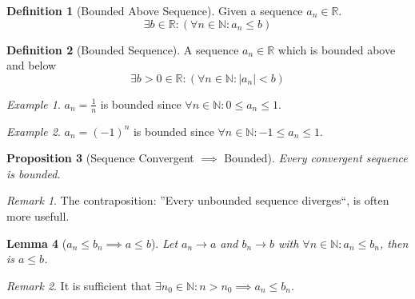 \documentclass[english,titlepage]{uzhpub}
\theoremstyle{definition}
\newtheorem{definition}{Definition}[section]
\theoremstyle{plain}
\newtheorem{proposition}[definition]{Proposition}
\newtheorem{lemma}[definition]{Lemma}
\theoremstyle{remark}
\newtheorem*{remark}{Remark}
\theoremstyle{example}
\newtheorem*{example}{Example}
\begin{document}
   \begin{definition}[Bounded Above Sequence]
      Given a sequence \(a_n \in \mathbb{R}\).
      \[\exists b \in \mathbb{R}: (\forall n \in \mathbb{N}: a_n \leq b)\]
   \end{definition}

   \begin{definition}[Bounded Sequence]
      A sequence \(a_n \in \mathbb{R}\) which is bounded above and below
      \[\exists b > 0 \in \mathbb{R}: (\forall n \in \mathbb{N}: |a_n| < b)\]
   \end{definition}
   \begin{example}
      \(a_n = \frac{1}{n}\) is bounded since \(\forall n \in \mathbb{N}: 0 \leq a_n \leq 1\).
   \end{example}
   \begin{example}
      \(a_n = (-1)^n\) is bounded since \(\forall n \in \mathbb{N}: -1 \leq a_n \leq 1\).
   \end{example}

   \begin{proposition}[Sequence Convergent \(\implies\) Bounded]\label{pro:convergent_bounded}
      Every convergent sequence is bounded.
   \end{proposition}
   \begin{remark}
      The contraposition: ''Every unbounded sequence diverges``, is often more usefull.
   \end{remark}

   \begin{lemma}[\(a_n \leq b_n \implies a \leq b\)]\label{lem:liman<limbn}
      Let \(a_n \to a\) and \(b_n \to b\) with \(\forall n \in \mathbb{N}: a_n \leq b_n\), then is \(a \leq b\).
   \end{lemma}
   \begin{remark}
      It is sufficient that \(\exists n_0 \in \mathbb{N}: n > n_0 \implies a_n \leq b_n\).
   \end{remark}

   \begin{center}
      
   \end{center}
\end{document}
